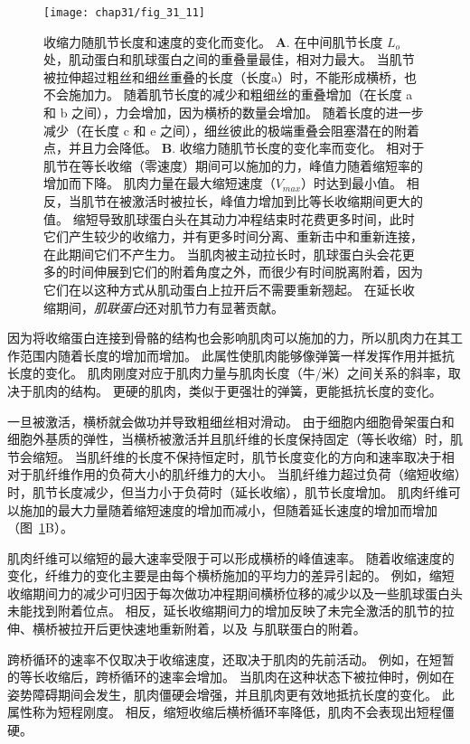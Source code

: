 \begin{figure}[htbp]
	\centering
	\texttt{[image: chap31/fig\_31\_11]}
	\caption{收缩力随肌节长度和速度的变化而变化。
	\textbf{A}. 在中间肌节长度 $ L_o $ 处，肌动蛋白和肌球蛋白之间的重叠量最佳，相对力最大。
	当肌节被拉伸超过粗丝和细丝重叠的长度（长度a）时，不能形成横桥，也不会施加力。
	随着肌节长度的减少和粗细丝的重叠增加（在长度 a 和 b 之间），力会增加，因为横桥的数量会增加。
	随着长度的进一步减少（在长度 c 和 e 之间），细丝彼此的极端重叠会阻塞潜在的附着点，并且力会降低。
	\textbf{B}. 收缩力随肌节长度的变化率而变化。
	相对于肌节在等长收缩（零速度）期间可以施加的力，峰值力随着缩短率的增加而下降。
	肌肉力量在最大缩短速度（$ V_{max} $）时达到最小值。
	相反，当肌节在被激活时被拉长，峰值力增加到比等长收缩期间更大的值。
	缩短导致肌球蛋白头在其动力冲程结束时花费更多时间，此时它们产生较少的收缩力，并有更多时间分离、重新击中和重新连接，在此期间它们不产生力。
	当肌肉被主动拉长时，肌球蛋白头会花更多的时间伸展到它们的附着角度之外，而很少有时间脱离附着，因为它们在以这种方式从肌动蛋白上拉开后不需要重新翘起。
	在延长收缩期间，\textit{肌联蛋白}还对肌节力有显著贡献。}
	\label{fig:31_11}
\end{figure}


因为将收缩蛋白连接到骨骼的结构也会影响肌肉可以施加的力，所以肌肉力在其工作范围内随着长度的增加而增加。
此属性使肌肉能够像弹簧一样发挥作用并抵抗长度的变化。
肌肉刚度对应于肌肉力量与肌肉长度（牛/米）之间关系的斜率，取决于肌肉的结构。
更硬的肌肉，类似于更强壮的弹簧，更能抵抗长度的变化。


一旦被激活，横桥就会做功并导致粗细丝相对滑动。
由于细胞内细胞骨架蛋白和细胞外基质的弹性，当横桥被激活并且肌纤维的长度保持固定（等长收缩）时，肌节会缩短。
当肌纤维的长度不保持恒定时，肌节长度变化的方向和速率取决于相对于肌纤维作用的负荷大小的肌纤维力的大小。
当肌纤维力超过负荷（缩短收缩）时，肌节长度减少，但当力小于负荷时（延长收缩），肌节长度增加。
肌肉纤维可以施加的最大力量随着缩短速度的增加而减小，但随着延长速度的增加而增加（图~\ref{fig:31_11}B）。


肌肉纤维可以缩短的最大速率受限于可以形成横桥的峰值速率。
随着收缩速度的变化，纤维力的变化主要是由每个横桥施加的平均力的差异引起的。
例如，缩短收缩期间力的减少可归因于每次做功冲程期间横桥位移的减少以及一些肌球蛋白头未能找到附着位点。
相反，延长收缩期间力的增加反映了未完全激活的肌节的拉伸、横桥被拉开后更快速地重新附着，以及  与肌联蛋白的附着。


跨桥循环的速率不仅取决于收缩速度，还取决于肌肉的先前活动。
例如，在短暂的等长收缩后，跨桥循环的速率会增加。
当肌肉在这种状态下被拉伸时，例如在姿势障碍期间会发生，肌肉僵硬会增强，并且肌肉更有效地抵抗长度的变化。
此属性称为短程刚度。
相反，缩短收缩后横桥循环率降低，肌肉不会表现出短程僵硬。



